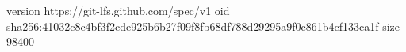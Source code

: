version https://git-lfs.github.com/spec/v1
oid sha256:41032c8c4bf3f2cde925b6b27f09f8fb68df788d29295a9f0c861b4cf133ca1f
size 98400

